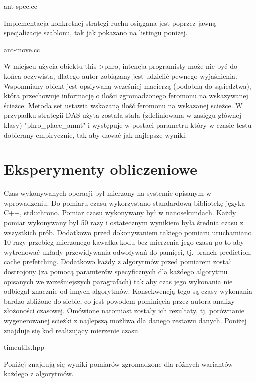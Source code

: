 \documentclass[polish,polish,a4paper]{article}
\begin{document}

{ant-spec.cc}

Implementacja konkretnej strategi ruchu osiągana jest poprzez jawną specjalizacje szablonu, tak jak pokazano na listingu poniżej.


{ant-move.cc}

W miejscu użycia obiektu this->phro, intencja programisty może nie być do końca oczywista, dlatego autor zobiązany jest udzielić pewnego wyjaśnienia.
Wspomniany obiekt jest opsiywaną wcześniej macierzą (podobną do sąsiedztwa), która przechowuje informację o ilości zgromadzonego feromonu na wskazywanej
ścieżce. Metoda set ustawia wskazaną ilość feromonu na wskazanej scieżce. W przypadku strategii DAS użyta została stała (zdefiniowana w zasięgu głównej
klasy) "phro\_place\_amnt" i występuje w postaci parametru który w czasie testu dobierany empirycznie, tak aby dawać jak najlepsze wyniki.

\pagebreak
\section{Eksperymenty obliczeniowe}
Czas wykonywanych operacji był mierzony na systemie opisanym w wprowadzeniu.
Do pomiaru czasu wykorzystano standardową bibliotekę języka C++, std::chrono.
Pomiar czasu wykonywany był w nanosekundach. Każdy pomiar wykonywany był 50 razy i ostatecznym wynikiem była średnia czasu z wszystkich prób.
Dodatkowo przed dokonywaniem takiego pomiaru uruchamiano 10 razy przebieg mierzonego kawałka kodu bez mierzenia jego czasu po to aby wytrenować układy przewidywania odwoływań do pamięci,
tj. branch prediction, cache prefetching.
Dodatkowo każdy z algorytmów przed pomiarem został dostrojony (za pomocą paramterów specyficznych dla każdego algorytmu opisanych we wcześniejszych
paragrafach) tak aby czas jego wykonania nie odbiegał znacznie od innych algorytmów. Konsekwencją tego są czasy wykonania bardzo zbliżone do siebie,
co jest powodem pominięcia przez autora analizy złożoności czasowej. Omówione natomiast zostały ich rezultaty, tj. porównanie wygenerowanej
scieżki z najlepszą możliwa dla danego zestawu danych.
Poniżej znajduje się kod realizujący mierzenie czasu.


{timeutils.hpp}

\par
Poniżej znajdują się wyniki pomiarów zgromadzone dla różnych wariantów każdego z algorytmów.
\end{document}
